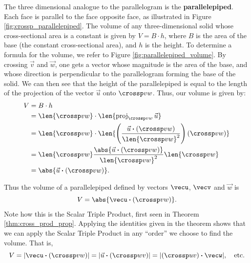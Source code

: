 The three dimensional analogue to the parallelogram is the \textbf{parallelepiped}. Each face is parallel to the face opposite face, as illustrated in Figure \ref{fig:crossp_parallelepiped}. The volume of any three-dimensional solid whose cross-sectional area is a constant is given by $V=B\cdot h$, where $B$ is the area of the base (the constant cross-sectional area), and $h$ is the height. To determine a formula for the volume, we refer to Figure \ref{fig:parallelepiped_volume}. By crossing $\vec v$ and $\vec w$, one gets a vector whose magnitude is the area of the base, and whose direction is perpendicular to the parallelogram forming the base of the solid. We can then see that the height of the parallelepiped is equal to the length of the projection of the vector $\vec u$ onto $\crossp vw$. Thus, our volume is given by:
\begin{align*}
V & = B\cdot h\\
  & = \len{\crossp vw}\cdot \len{\operatorname{proj}_{\crossp vw}\vec{u}}\\
  & = \len{\crossp vw}\cdot\len{\left(\frac{\vec{u}\boldsymbol{\cdot}(\crossp vw)}{\len{\crossp vw}^2}\right)(\crossp vw)}\\
  & = \len{\crossp vw}\frac{\abs{\vec{u}\boldsymbol{\cdot}(\crossp vw)}}{\len{\crossp vw}^2}\len{\crossp vw}\\
  & = \abs{\vec{u}\boldsymbol{\cdot}(\crossp vw)}.
\end{align*}


Thus the volume of a parallelepiped defined by vectors $\vecu$, $\vecv$ and $\vec w$ is 
\begin{equation}
V = \abs{\vecu\boldsymbol{\cdot} (\crossp vw)}.\label{eq:crossp2}
\end{equation}
Note how this is the Scalar Triple Product, first seen in Theorem \ref{thm:cross_prod_prop}. Applying the identities given in the theorem shows that we can apply the Scalar Triple Product in any ``order'' we choose to find the volume. That is,
\[
V = |\vecu\boldsymbol{\cdot}(\crossp vw)| = |\vec u\boldsymbol{\cdot} (\crossp wv)| = |(\crossp uv)\boldsymbol{\cdot} \vecw|,\quad \text{etc.}
\]

